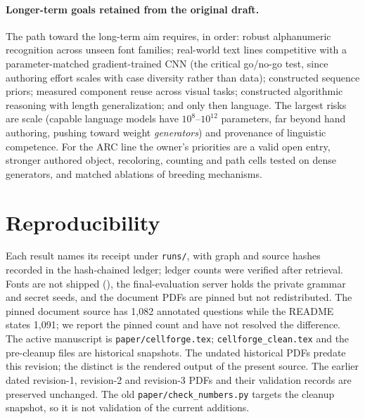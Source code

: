 \documentclass[11pt]{article}
\begin{document}
\paragraph{Longer-term goals retained from the original draft.}
The path toward the long-term aim requires, in order: robust alphanumeric recognition across unseen font
families; real-world text lines competitive with a parameter-matched gradient-trained CNN (the critical
go/no-go test, since authoring effort scales with case diversity rather than data); constructed sequence
priors; measured component reuse across visual tasks; constructed algorithmic reasoning with length
generalization; and only then language. The largest risks are scale (capable language models have
$10^8$--$10^{12}$ parameters, far beyond hand authoring, pushing toward weight \emph{generators}) and
provenance of linguistic competence. For the ARC line the owner's priorities are a valid open entry, stronger
authored object, recoloring, counting and path cells tested on dense generators, and matched ablations of
breeding mechanisms.

\section{Reproducibility}\label{sec:repro}
Each result names its receipt under \texttt{runs/}, with graph and source hashes recorded in the
hash-chained ledger; ledger counts were verified after retrieval. Fonts are not shipped
(), the final-evaluation server holds the private grammar and secret seeds, and the
document PDFs are pinned but not redistributed. The pinned document source has 1{,}082 annotated questions while
the README states 1{,}091; we report the pinned count and have not resolved the difference.
The active manuscript is \texttt{paper/cellforge.tex}; \texttt{cellforge\_clean.tex} and the
pre-cleanup files are historical snapshots. The undated historical PDFs predate this revision; the distinct
 is the rendered output of the present source. The earlier
dated revision-1, revision-2 and revision-3 PDFs and their validation records are preserved unchanged. The old \texttt{paper/check\_numbers.py} targets the cleanup
snapshot, so it is not validation of the current additions.
\end{document}

